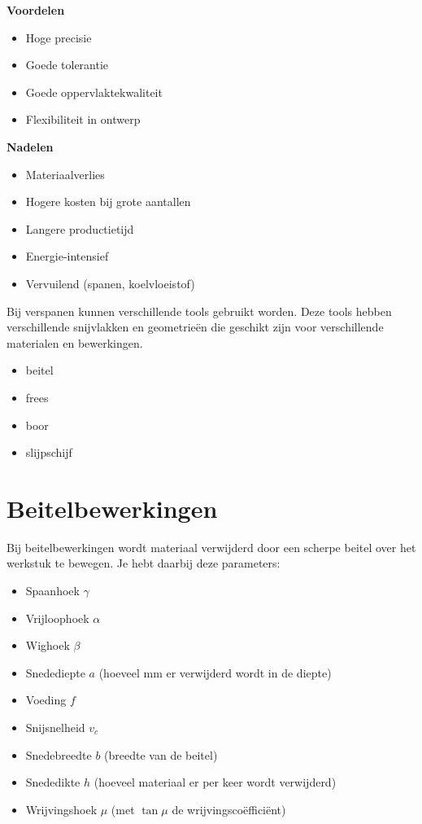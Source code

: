 \documentclass[a4paper,11pt,twoside]{report}
\begin{document}
\textbf{Voordelen}
\begin{itemize}
    \item Hoge precisie
    \item Goede tolerantie
    \item Goede oppervlaktekwaliteit
    \item Flexibiliteit in ontwerp
\end{itemize}

\textbf{Nadelen}
\begin{itemize}
    \item Materiaalverlies
    \item Hogere kosten bij grote aantallen
    \item Langere productietijd
    \item Energie-intensief
    \item Vervuilend (spanen, koelvloeistof)
\end{itemize}

Bij verspanen kunnen verschillende tools gebruikt worden.
Deze tools hebben verschillende snijvlakken en geometrieën
die geschikt zijn voor verschillende materialen en bewerkingen.

\begin{itemize}
    \item beitel
    \item frees
    \item boor
    \item slijpschijf
\end{itemize}

\section{Beitelbewerkingen}
Bij beitelbewerkingen wordt materiaal verwijderd door een scherpe
beitel over het werkstuk te bewegen.
Je hebt daarbij deze parameters:
\begin{itemize}
    \item Spaanhoek $\gamma$
    \item Vrijloophoek $\alpha$
    \item Wighoek $\beta$
    \item Snedediepte $a$ (hoeveel mm er verwijderd wordt in de diepte)
    \item Voeding $f$
    \item Snijsnelheid $v_c$
    \item Snedebreedte $b$ (breedte van de beitel)
    \item Snededikte $h$ (hoeveel materiaal er per keer wordt verwijderd)
    \item Wrijvingshoek $\mu$ (met $\tan\mu$ de wrijvingscoëfficiënt)
\end{itemize}
\end{document}
